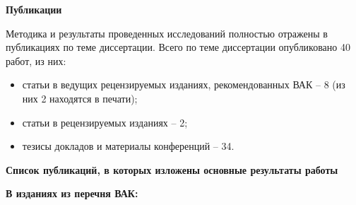 \textbf{Публикации}

Методика и результаты проведенных исследований полностью отражены в публикациях по теме диссертации. Всего по теме диссертации опубликовано 40 работ, из них:
\begin{itemize}
  \item статьи в ведущих рецензируемых изданиях, рекомендованных
ВАК – 8 (из них 2 находятся в печати);
  \item статьи в рецензируемых изданиях – 2;
  \item тезисы докладов и материалы конференций – 34.
\end{itemize}

\textbf{Список публикаций, в которых изложены основные результаты работы}

\textbf{В изданиях из перечня ВАК:}

